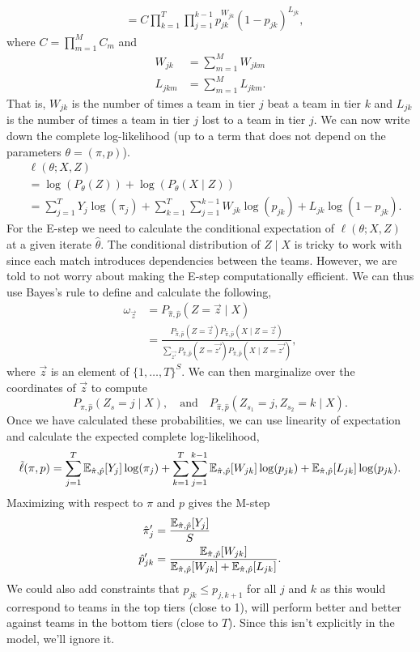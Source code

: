 \begin{enumerate}
\begin{align*}
		&=C\prod_{k=1}^T\prod_{j=1}^{k-1} p_{jk}^{W_{jk}}(1-p_{jk})^{L_{jk}},
	\end{align*}
	where $C=\prod_{m=1}^M C_m$ and
	\begin{align*}
		W_{jk}&=\sum_{m=1}^M W_{jkm}\\
		L_{jkm}&=\sum_{m=1}^M L_{jkm}.
	\end{align*}
	That is, $W_{jk}$ is the number of times a team in tier $j$ beat a team in tier $k$ and $L_{jk}$ is the number of times a team in tier $j$ lost to a team in tier $j$. We can now write down the complete log-likelihood (up to a term that does not depend on the parameters $\theta = (\pi,p)$).
	\begin{align*}
		&\ell(\theta;X,Z)\\
		&=\log(P_\theta(Z)) + \log(P_\theta(X \mid Z))\\
		&=\sum_{j=1}^T Y_j \log(\pi_j) + \sum_{k=1}^T\sum_{j=1}^{k-1} W_{jk}\log(p_{jk})+L_{jk}\log(1-p_{jk}).
	\end{align*} 
	For the E-step we need to calculate the conditional expectation of $\ell(\theta;X,Z)$ at a given iterate $\hat{\theta}$. The conditional distribution of $Z\mid X$ is tricky to work with since each match introduces dependencies between the teams. However, we are told to not worry about making the E-step computationally efficient. We can thus use Bayes's rule to define and calculate the following, 
	\begin{align}\label{EM:latent}
		\omega_{\vec{z}}&=P_{\hat{\pi},\hat{p}}(Z = \vec{z}\mid X)\\
		&=\frac{P_{\hat{\pi},\hat{p}}(Z = \vec{z})P_{\hat{\pi},\hat{p}}(X \mid Z = \vec{z})}{\sum_{\vec{z'}}P_{\hat{\pi},\hat{p}}(Z = \vec{z'})P_{\hat{\pi},\hat{p}}(X \mid Z = \vec{z'})},\nonumber
	\end{align}
	where $\vec{z}$ is an element of $\{1,\ldots,T\}^S$. We can then marginalize over the coordinates of $\vec{z}$ to compute
	\[P_{\hat{\pi},\hat{p}}(Z_s = j\mid X), \quad \text{and} \quad P_{\hat{\pi},\hat{p}}(Z_{s_1} = j, Z_{s_2}=k\mid X). \]
	Once we have calculated these probabilities, we can use linearity of expectation and calculate the expected complete log-likelihood,
	\[\tilde{\ell}(\pi,p) = \sum_{j=1}^T {\mathbb E}_{\hat{\pi},\hat{p}}[Y_j]\log(\pi_j) + \sum_{k=1}^T\sum_{j=1}^{k-1} {\mathbb E}_{\hat{\pi},\hat{p}}[W_{jk}]\log(p_{jk})+{\mathbb E}_{\hat{\pi},\hat{p}}[L_{jk}]\log(p_{jk}).  \]
	Maximizing with respect to $\pi$ and $p$ gives the M-step
	\begin{align*}
		\hat{\pi}'_j &= \frac{{\mathbb E}_{\hat{\pi},\hat{p}}[Y_j]}{S}\\
		\hat{p}'_{jk} &= \frac{{\mathbb E}_{\hat{\pi},\hat{p}}[W_{jk}]}{{\mathbb E}_{\hat{\pi},\hat{p}}[W_{jk}]+{\mathbb E}_{\hat{\pi},\hat{p}}[L_{jk}]}.
	\end{align*}
	We could also add constraints that $p_{jk} \le p_{j,k+1}$ for all $j$ and $k$ as this would correspond to teams in the top tiers (close to 1), will perform better and better against teams in the bottom tiers (close to $T$). Since this isn't explicitly in the model, we'll ignore it. 
	

\end{enumerate}

